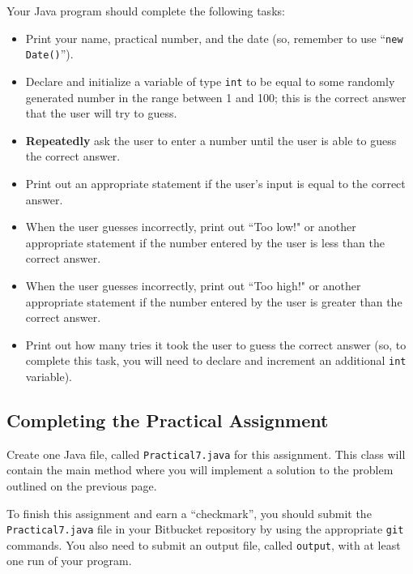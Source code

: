 Your Java program should complete the following tasks:

\begin{itemize}

  \item Print your name, practical number, and the date (so, remember to use ``{\tt new Date()}'').

  \item Declare and initialize a variable of type {\tt int} to be equal to some randomly generated number in the range
    between 1 and 100; this is the correct answer that the user will try to guess.

  \item \textbf{Repeatedly} ask the user to enter a number until the user is able to guess the correct answer.

  \item Print out an appropriate statement if the user's input is equal to the correct answer.

  \item When the user guesses incorrectly, print out ``Too low!" or another appropriate statement if the number entered
    by the user is less than the correct answer.

  \item When the user guesses incorrectly, print out ``Too high!" or another appropriate statement if the number entered
    by the user is greater than the correct answer.

  \item Print out how many tries it took the user to guess the correct answer (so, to complete this task, you will need
    to declare and increment an additional {\tt int} variable).

\end{itemize}

\vspace*{-.1in}
\subsection*{Completing the Practical Assignment}

\vspace*{-.1in}
Create one Java file, called {\tt Practical7.java} for this assignment.
This class will contain the main method where you will implement a
solution to the problem outlined on the previous page.

\noindent To finish this assignment and earn a ``checkmark'', you should submit the
{\tt Practical7.java} file in your Bitbucket repository by using
the appropriate {\tt git} commands. You also need to submit an output file,
called {\tt output}, with at least one run of your program.

